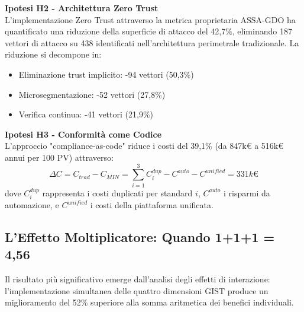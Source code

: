 \textbf{Ipotesi H2 - Architettura Zero Trust}\\
L'implementazione Zero Trust attraverso la metrica proprietaria ASSA-GDO ha quantificato una riduzione della superficie di attacco del 42,7\%, eliminando 187 vettori di attacco su 438 identificati nell'architettura perimetrale tradizionale. La riduzione si decompone in:
\begin{itemize}
\item Eliminazione trust implicito: -94 vettori (50,3\%)
\item Microsegmentazione: -52 vettori (27,8\%)
\item Verifica continua: -41 vettori (21,9\%)
\end{itemize}

\textbf{Ipotesi H3 - Conformità come Codice}\\
L'approccio "compliance-as-code" riduce i costi del 39,1\% (da 847k€ a 516k€ annui per 100 PV) attraverso:
\begin{equation}
\Delta C = C_{trad} - C_{MIN} = \sum_{i=1}^{3} C_i^{dup} - C^{auto} - C^{unified} = 331k€
\end{equation}
dove $C_i^{dup}$ rappresenta i costi duplicati per standard $i$, $C^{auto}$ i risparmi da automazione, e $C^{unified}$ i costi della piattaforma unificata.

\subsection{\texorpdfstring{L'Effetto Moltiplicatore: Quando 1+1+1 = 4,56}{5.2.3 - L'Effetto Moltiplicatore}}
\label{subsec:5.2.3}

Il risultato più significativo emerge dall'analisi degli effetti di interazione: l'implementazione simultanea delle quattro dimensioni GIST produce un miglioramento del 52\% superiore alla somma aritmetica dei benefici individuali.

